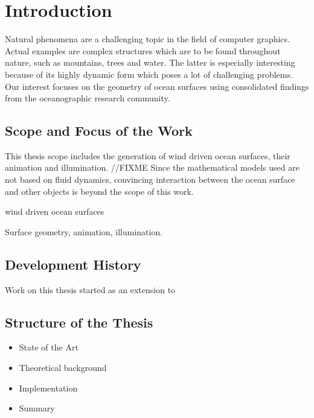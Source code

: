 \chapter{Introduction}

Natural phenomena are a challenging topic in the field of computer graphics.
Actual examples are complex structures which are to be found throughout nature,
such as mountains, trees and water. The latter is especially interesting
because of its highly dynamic form which poses a lot of challenging problems.
Our interest focuses on the geometry of ocean surfaces using
consolidated findings from the oceanographic research community.

\section{Scope and Focus of the Work}

This thesis scope includes the generation of wind driven ocean surfaces, their
animation and illumination. //FIXME
Since the mathematical models used are not based on fluid dynamics,
convincing interaction between the ocean surface and other objects is beyond the
scope of this work.

wind driven ocean surfaces

Surface geometry, animation, illumination.

\section{Development History}

Work on this thesis started as an extension to \cite{thesis:rost}

\section{Structure of the Thesis}

\begin{itemize}

\item State of the Art
\item Theoretical background
\item Implementation
\item Summary

\end{itemize}

